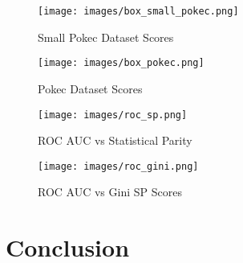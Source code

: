 \documentclass[sigconf,authordraft]{acmart}
\begin{document}
\begin{figure}[H]

  \centering
  \texttt{[image: images/box\_small\_pokec.png]}
  \caption{Small Pokec Dataset Scores}
\end{figure}
\begin{figure}[H]

  \centering
  \texttt{[image: images/box\_pokec.png]}
  \caption{Pokec Dataset Scores}
\end{figure}
\begin{figure}[H]

  \centering
  \texttt{[image: images/roc\_sp.png]}
  \caption{ROC AUC vs Statistical Parity}

\end{figure}
\begin{figure}[H]

  \centering
  \texttt{[image: images/roc\_gini.png]}
  \caption{ROC AUC vs Gini SP Scores}

\end{figure}
\section{Conclusion}



\begin{acks}
\end{acks}




\appendix
\end{document}
